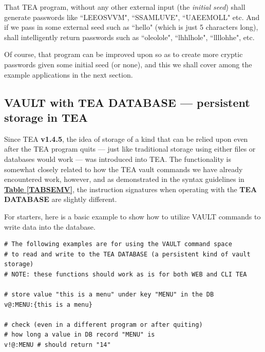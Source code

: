 \documentclass[a4paper, 18pt]{book} %
\begin{document}
{{{\vspace{2em}

That TEA program, without any other external input (the \textit{initial seed}) shall generate passwords like ``LEEOSVVM", ``SSAMLUVE", ``UAEEMOLL" etc. And if we pass in some external seed such as ``hello" (which is just 5 characters long), shall intelligently return passwords such as ``oleolole", ``lhhlhole", ``llllohhe", etc.

\vspace{2em}


Of course, that program can be improved upon so as to create more cryptic passwords given some initial seed (or none), and this we shall cover among the example applications in the next section.


\subsection{VAULT with TEA DATABASE --- persistent storage in TEA}

Since TEA \textbf{v1.4.5}, the idea of storage of a kind that can be relied upon even after the TEA program quits --- just like traditional storage using either files or databases would work --- was introduced into TEA. The functionality is somewhat closely related to how the TEA vault commands we have already encountered work, however, and as demonstrated in the syntax guidelines in \textbf{\hyperref[TABSEMV]{Table \ref{TABSEMV}}}, the instruction signatures when operating with the \textbf{TEA DATABASE} are slightly different.

\vspace{2em}

For starters, here is a basic example to show how to utilize VAULT commands to write data into the database.


\vspace{2em}

  \begin{tcolorbox}[teaterminalstyle, title=V: EXAMPLE 4: Basic TEA Database Operations, breakable]
  \begin{lstlisting}[language=TEA,breaklines=true,]
# The following examples are for using the VAULT command space
# to read and write to the TEA DATABASE (a persistent kind of vault storage)
# NOTE: these functions should work as is for both WEB and CLI TEA

# store value "this is a menu" under key "MENU" in the DB
v@:MENU:{this is a menu}

# check (even in a different program or after quiting)
# how long a value in DB record "MENU" is
v!@:MENU # should return "14"


\end{lstlisting}
\end{tcolorbox}}}}
\end{document}

